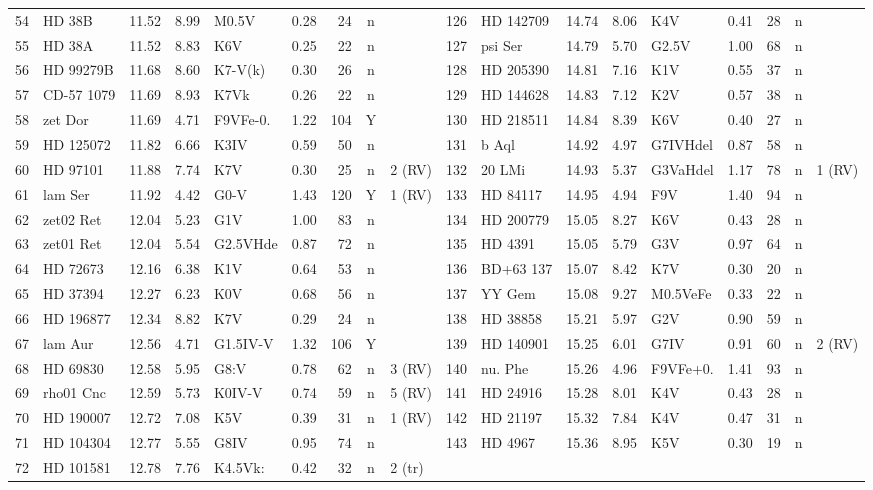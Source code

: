 \begin{landscape}
\begin{longtable}{r l r r l r r c l @{\;\vrule\;} r l r r l r r c l}
54 & HD 38B & 11.52 & 8.99 & M0.5V & 0.28 & 24 & n &  & 126 & HD 142709 & 14.74 & 8.06 & K4V & 0.41 & 28 & n &  \\
55 & HD 38A & 11.52 & 8.83 & K6V & 0.25 & 22 & n &  & 127 & psi Ser & 14.79 & 5.70 & G2.5V & 1.00 & 68 & n &  \\
56 & HD 99279B & 11.68 & 8.60 & K7-V(k) & 0.30 & 26 & n &  & 128 & HD 205390 & 14.81 & 7.16 & K1V & 0.55 & 37 & n &  \\
57 & CD-57 1079 & 11.69 & 8.93 & K7Vk & 0.26 & 22 & n &  & 129 & HD 144628 & 14.83 & 7.12 & K2V & 0.57 & 38 & n &  \\
58 & zet Dor & 11.69 & 4.71 & F9VFe-0. & 1.22 & 104 & Y &  & 130 & HD 218511 & 14.84 & 8.39 & K6V & 0.40 & 27 & n &  \\
59 & HD 125072 & 11.82 & 6.66 & K3IV & 0.59 & 50 & n &  & 131 & b Aql & 14.92 & 4.97 & G7IVHdel & 0.87 & 58 & n &  \\
60 & HD 97101 & 11.88 & 7.74 & K7V & 0.30 & 25 & n & 2 (RV) & 132 & 20 LMi & 14.93 & 5.37 & G3VaHdel & 1.17 & 78 & n & 1 (RV) \\
61 & lam Ser & 11.92 & 4.42 & G0-V & 1.43 & 120 & Y & 1 (RV) & 133 & HD 84117 & 14.95 & 4.94 & F9V & 1.40 & 94 & n &  \\
62 & zet02 Ret & 12.04 & 5.23 & G1V & 1.00 & 83 & n &  & 134 & HD 200779 & 15.05 & 8.27 & K6V & 0.43 & 28 & n &  \\
63 & zet01 Ret & 12.04 & 5.54 & G2.5VHde & 0.87 & 72 & n &  & 135 & HD 4391 & 15.05 & 5.79 & G3V & 0.97 & 64 & n &  \\
64 & HD 72673 & 12.16 & 6.38 & K1V & 0.64 & 53 & n &  & 136 & BD+63 137 & 15.07 & 8.42 & K7V & 0.30 & 20 & n &  \\
65 & HD 37394 & 12.27 & 6.23 & K0V & 0.68 & 56 & n &  & 137 & YY Gem & 15.08 & 9.27 & M0.5VeFe & 0.33 & 22 & n &  \\
66 & HD 196877 & 12.34 & 8.82 & K7V & 0.29 & 24 & n &  & 138 & HD 38858 & 15.21 & 5.97 & G2V & 0.90 & 59 & n &  \\
67 & lam Aur & 12.56 & 4.71 & G1.5IV-V & 1.32 & 106 & Y &  & 139 & HD 140901 & 15.25 & 6.01 & G7IV & 0.91 & 60 & n & 2 (RV) \\
68 & HD 69830 & 12.58 & 5.95 & G8:V & 0.78 & 62 & n & 3 (RV) & 140 & nu. Phe & 15.26 & 4.96 & F9VFe+0. & 1.41 & 93 & n &  \\
69 & rho01 Cnc & 12.59 & 5.73 & K0IV-V & 0.74 & 59 & n & 5 (RV) & 141 & HD 24916 & 15.28 & 8.01 & K4V & 0.43 & 28 & n &  \\
70 & HD 190007 & 12.72 & 7.08 & K5V & 0.39 & 31 & n & 1 (RV) & 142 & HD 21197 & 15.32 & 7.84 & K4V & 0.47 & 31 & n &  \\
71 & HD 104304 & 12.77 & 5.55 & G8IV & 0.95 & 74 & n &  & 143 & HD 4967 & 15.36 & 8.95 & K5V & 0.30 & 19 & n &  \\
72 & HD 101581 & 12.78 & 7.76 & K4.5Vk: & 0.42 & 32 & n & 2 (tr) &  &  &  &  &  &  &  &  &  \\
\end{longtable}
\end{landscape}
